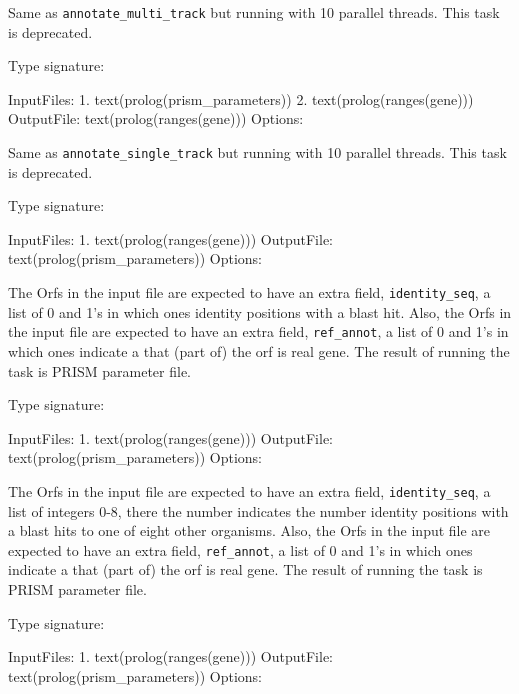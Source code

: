 \begin{description}
Same as \verb$annotate_multi_track$ but running with 10 parallel threads.
This task is deprecated.

Type signature:

\begin{code}
InputFiles:
    1. text(prolog(prism_parameters))
    2. text(prolog(ranges(gene)))
OutputFile:
    text(prolog(ranges(gene)))
Options:
\end{code}

Same as \verb$annotate_single_track$ but running with 10 parallel threads.
This task is deprecated.

Type signature:

\begin{code}
InputFiles:
    1. text(prolog(ranges(gene)))
OutputFile:
    text(prolog(prism_parameters))
Options:
\end{code}

The Orfs in the input file are expected to have an extra field, \verb$identity_seq$, a list of 0 and 1's in which ones identity positions with a blast hit.
Also, the Orfs in the input file are expected to have an extra field, \verb$ref_annot$, a list of 0 and 1's in which ones indicate a that (part of) the orf is real gene.
The result of running the task is PRISM parameter file.

Type signature:

\begin{code}
InputFiles:
    1. text(prolog(ranges(gene)))
OutputFile:
    text(prolog(prism_parameters))
Options:
\end{code}

The Orfs in the input file are expected to have an extra field, \verb$identity_seq$, a list of integers 0-8, there the number indicates the number identity positions with a blast hits to one of eight other organisms.
Also, the Orfs in the input file are expected to have an extra field, \verb$ref_annot$, a list of 0 and 1's in which ones indicate a that (part of) the orf is real gene.
The result of running the task is PRISM parameter file.

Type signature:

\begin{code}
InputFiles:
    1. text(prolog(ranges(gene)))
OutputFile:
    text(prolog(prism_parameters))
Options:
\end{code}


\end{description}
